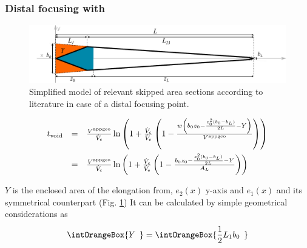 \subsubsection*{Distal focusing with }
\begin{figure}[h]
  \begin{center}
    \includegraphics[width=\linewidth]{./images/fffApprox1.pdf}
    \vspace*{-3ex}    
  \end{center}
  \caption[Skipped area section - proximal focusing, simplified approximation]{
    Simplified model of relevant skipped area sections according to literature 
    in case of a distal focusing point.}
  \label{fig:fffApprox1}
\end{figure}
\begin{equation}
\begin{array}{lll}
\tvoid &= & \frac{\Vappgeo}{\Vc} \ln{
  \left(
  1 + \frac{\Vc}{\Ve}
  \left(
  1 - \frac{
    w 
    \left(
    b_0 z_0 
    - \frac{
      z_0^2 (b_0 - \bL)
    }{
      2L} 
    - Y
    \right)
  }{\Vappgeo}
  \right)
  \right)}
\\\addlinespace
&= &\frac{\Vappgeo}{\Vc} \ln{
  \left(
  1 + \frac{\Vc}{\Ve}
  \left(
  1 - \frac{
    b_0 z_0 
    - \frac{
      z_0^2 (b_0 - b_L)
    }{
      2L
    } 
    -  Y
  }{
\AL
}
  \right)
  \right)}
\end{array}
\end{equation}

$Y$ is the enclosed area of the elongation from,
$e_2(x)$ y-axis and $e_1(x)$ and its symmetrical counterpart 
(Fig. \ref{fig:fffApprox1})
It can be calculated by simple geometrical considerations as 
\begin{equation}
\intOrangeBox{\ensuremath{ Y \hspace{-4ex}\phantom{\left(\frac{1}{2}\right)} }} 
=\intOrangeBox{\ensuremath{\frac{1}{2}  L_1 b_0 \hspace{-4ex}\phantom{\left(\frac{1}{2}\right)} } }
\end{equation}

